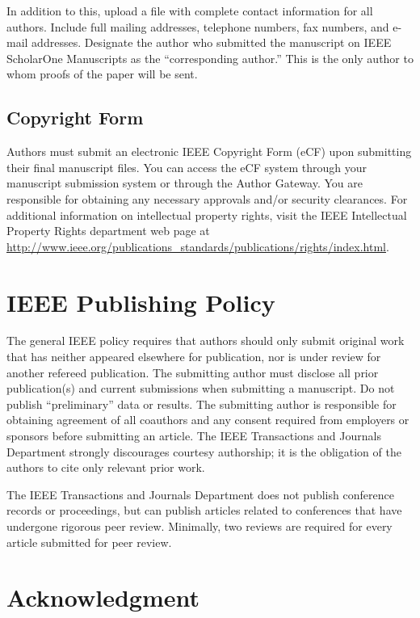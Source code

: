 \documentclass[journal,twoside,web]{ieeecolor}
\begin{document}
In addition to this, upload a file with complete contact information for all
authors. Include full mailing addresses, telephone numbers, fax numbers, and
e-mail addresses. Designate the author who submitted the manuscript on
IEEE ScholarOne Manuscripts as the ``corresponding author.'' This is the only
author to whom proofs of the paper will be sent.

\subsection{Copyright Form}
Authors must submit an electronic IEEE Copyright Form (eCF) upon submitting 
their final manuscript files. You can access the eCF system through your 
manuscript submission system or through the Author Gateway. You are 
responsible for obtaining any necessary approvals and/or security 
clearances. For additional information on intellectual property rights, 
visit the IEEE Intellectual Property Rights department web page at 
\underline{http://www.ieee.org/publications\_standards/publications/rights/}\discretionary{}{}{}\underline{index.html}.

\section*{IEEE Publishing Policy}
The general IEEE policy requires that authors should only submit original 
work that has neither appeared elsewhere for publication, nor is under 
review for another refereed publication. The submitting author must disclose 
all prior publication(s) and current submissions when submitting a 
manuscript. Do not publish ``preliminary'' data or results. The submitting 
author is responsible for obtaining agreement of all coauthors and any 
consent required from employers or sponsors before submitting an article. 
The IEEE Transactions and Journals Department strongly discourages courtesy 
authorship; it is the obligation of the authors to cite only relevant prior 
work.

The IEEE Transactions and Journals Department does not publish conference 
records or proceedings, but can publish articles related to conferences that 
have undergone rigorous peer review. Minimally, two reviews are required for 
every article submitted for peer review.

\section*{Acknowledgment}
\end{document}
